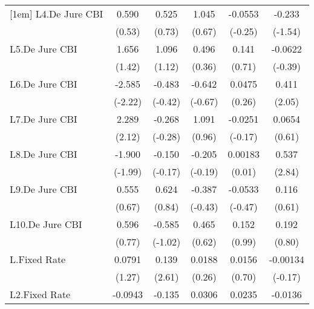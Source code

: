 {\begin{longtable}{l*{5}{c}}
[1em]
L4.De Jure CBI  &    0.590         &    0.525         &    1.045         &  -0.0553         &   -0.233         \\
                &   (0.53)         &   (0.73)         &   (0.67)         &  (-0.25)         &  (-1.54)         \\
[1em]
L5.De Jure CBI  &    1.656         &    1.096         &    0.496         &    0.141         &  -0.0622         \\
                &   (1.42)         &   (1.12)         &   (0.36)         &   (0.71)         &  (-0.39)         \\
[1em]
L6.De Jure CBI  &   -2.585\sym{*}  &   -0.483         &   -0.642         &   0.0475         &    0.411\sym{*}  \\
                &  (-2.22)         &  (-0.42)         &  (-0.67)         &   (0.26)         &   (2.05)         \\
[1em]
L7.De Jure CBI  &    2.289\sym{*}  &   -0.268         &    1.091         &  -0.0251         &   0.0654         \\
                &   (2.12)         &  (-0.28)         &   (0.96)         &  (-0.17)         &   (0.61)         \\
[1em]
L8.De Jure CBI  &   -1.900\sym{*}  &   -0.150         &   -0.205         &  0.00183         &    0.537\sym{**} \\
                &  (-1.99)         &  (-0.17)         &  (-0.19)         &   (0.01)         &   (2.84)         \\
[1em]
L9.De Jure CBI  &    0.555         &    0.624         &   -0.387         &  -0.0533         &    0.116         \\
                &   (0.67)         &   (0.84)         &  (-0.43)         &  (-0.47)         &   (0.61)         \\
[1em]
L10.De Jure CBI &    0.596         &   -0.585         &    0.465         &    0.152         &    0.192         \\
                &   (0.77)         &  (-1.02)         &   (0.62)         &   (0.99)         &   (0.80)         \\
[1em]
L.Fixed Rate    &   0.0791         &    0.139\sym{*}  &   0.0188         &   0.0156         & -0.00134         \\
                &   (1.27)         &   (2.61)         &   (0.26)         &   (0.70)         &  (-0.17)         \\
[1em]
L2.Fixed Rate   &  -0.0943         &   -0.135\sym{**} &   0.0306         &   0.0235         &  -0.0136         \\

\end{longtable}}

